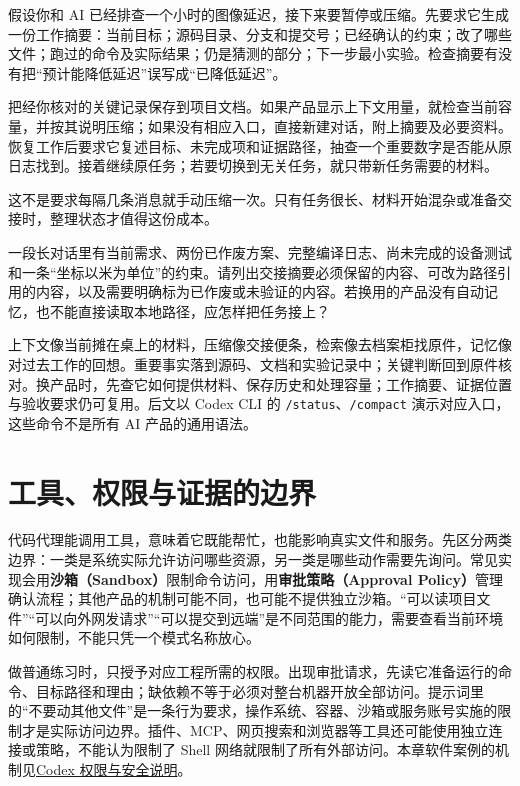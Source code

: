 \begin{example}[长任务中途换班]
假设你和 AI 已经排查一个小时的图像延迟，接下来要暂停或压缩。先要求它生成一份工作摘要：当前目标；源码目录、分支和提交号；已经确认的约束；改了哪些文件；跑过的命令及实际结果；仍是猜测的部分；下一步最小实验。检查摘要有没有把“预计能降低延迟”误写成“已降低延迟”。

把经你核对的关键记录保存到项目文档。如果产品显示上下文用量，就检查当前容量，并按其说明压缩；如果没有相应入口，直接新建对话，附上摘要及必要资料。恢复工作后要求它复述目标、未完成项和证据路径，抽查一个重要数字是否能从原日志找到。接着继续原任务；若要切换到无关任务，就只带新任务需要的材料。

这不是要求每隔几条消息就手动压缩一次。只有任务很长、材料开始混杂或准备交接时，整理状态才值得这份成本。
\end{example}

\begin{exercise}\label{ex:ai-principle-context}
一段长对话里有当前需求、两份已作废方案、完整编译日志、尚未完成的设备测试和一条“坐标以米为单位”的约束。请列出交接摘要必须保留的内容、可改为路径引用的内容，以及需要明确标为已作废或未验证的内容。若换用的产品没有自动记忆，也不能直接读取本地路径，应怎样把任务接上？
\end{exercise}

\begin{conclusion}
上下文像当前摊在桌上的材料，压缩像交接便条，检索像去档案柜找原件，记忆像对过去工作的回想。重要事实落到源码、文档和实验记录中；关键判断回到原件核对。换产品时，先查它如何提供材料、保存历史和处理容量；工作摘要、证据位置与验收要求仍可复用。后文以 Codex CLI 的 \texttt{/status}、\texttt{/compact} 演示对应入口，这些命令不是所有 AI 产品的通用语法。
\end{conclusion}

\section{工具、权限与证据的边界}
\label{sec:ai-evidence}

代码代理能调用工具，意味着它既能帮忙，也能影响真实文件和服务。先区分两类边界：一类是系统实际允许访问哪些资源，另一类是哪些动作需要先询问。常见实现会用\textbf{沙箱（Sandbox）}限制命令访问，用\textbf{审批策略（Approval Policy）}管理确认流程；其他产品的机制可能不同，也可能不提供独立沙箱。“可以读项目文件”“可以向外网发请求”“可以提交到远端”是不同范围的能力，需要查看当前环境如何限制，不能只凭一个模式名称放心。

做普通练习时，只授予对应工程所需的权限。出现审批请求，先读它准备运行的命令、目标路径和理由；缺依赖不等于必须对整台机器开放全部访问。提示词里的“不要动其他文件”是一条行为要求，操作系统、容器、沙箱或服务账号实施的限制才是实际访问边界。插件、MCP、网页搜索和浏览器等工具还可能使用独立连接或策略，不能认为限制了 Shell 网络就限制了所有外部访问。本章软件案例的机制见\href{https://learn.chatgpt.com/docs/agent-approvals-security}{Codex 权限与安全说明}。

